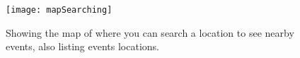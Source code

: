 \documentclass[letterpaper,10pt,onecolumn]{IEEEtran} %
\begin{document}
\begin{enumerate}[label*=\arabic*.]
\end{enumerate}

\begin{figure}[htp]
  \begin{center}
  
  \texttt{[image: mapSearching]}
  \centering
  \caption{Showing the map of where you can search a location to see nearby events, also listing events locations. }

  \end{center}
\end{figure}
\end{document}
